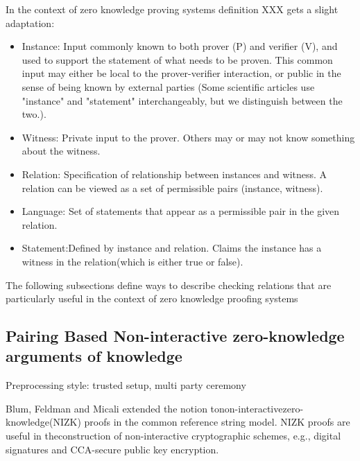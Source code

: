 In the context of zero knowledge proving systems definition XXX gets a slight adaptation:
\begin{itemize}
\item Instance: Input commonly known to both prover (P) and verifier (V), and used to support the statement of what needs to be proven. This common input may either be local to the prover-verifier interaction, or public in the sense of being known by external parties (Some scientific articles use "instance" and "statement" interchangeably, but we distinguish between the two.).
\item Witness: Private input to the prover. Others may or may not know something about the witness.
\item Relation: Specification of relationship between instances and witness. A relation can be viewed as a set of permissible pairs (instance, witness).
\item Language: Set of statements that appear as a permissible pair in the given relation.
\item Statement:Defined by instance and relation. Claims the instance has a witness in the relation(which is either true or false).
\end{itemize}

The following subsections define ways to describe checking relations that are particularly useful in the context of zero knowledge proofing systems



\subsection{Pairing Based Non-interactive zero-knowledge arguments of knowledge}

Preprocessing style: trusted setup, multi party ceremony

Blum, Feldman and Micali
 extended the notion tonon-interactivezero-knowledge(NIZK)  proofs in the  common  reference  string  model.  NIZK  proofs  are  useful  in  theconstruction of non-interactive cryptographic schemes, e.g., digital signatures and CCA-secure public key encryption.
 
